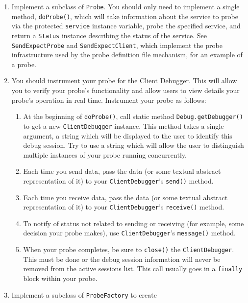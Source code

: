 \documentclass{article}
\newcommand{\identifier}[1]{{\tt #1}}
\begin{document}
\begin{enumerate}
\item Implement a subclass of \identifier{Probe}. You should only need
  to implement a single method, \identifier{doProbe()}, which will
  take information about the service to probe via the protected
  \identifier{service} instance variable, probe the specified service,
  and return a \identifier{Status} instance describing the status of
  the service. See \identifier{SendExpectProbe} and
  \identifier{SendExpectClient}, which implement the probe
  infrastructure used by the probe definition file mechanism, for an
  example of a probe.
\item You should instrument your probe for the Client Debugger. This
  will allow you to verify your probe's functionality and allow users
  to view details your probe's operation in real time. Instrument your
  probe as follows:
  \begin{enumerate}
    \item At the beginning of \identifier{doProbe()}, call static
      method \identifier{Debug.getDebugger()} to get a new
      \identifier{ClientDebugger} instance. This method takes a single
      argument, a string which will be displayed to the user to
      identify this debug session. Try to use a string which will
      allow the user to distinguish multiple instances of your probe
      running concurrently.
    \item Each time you send data, pass the data (or some textual abstract
      representation of it) to your \identifier{ClientDebugger}'s
      \identifier{send()} method.
    \item Each time you receive data, pass the data (or some textual abstract
      representation of it) to your \identifier{ClientDebugger}'s
      \identifier{receive()} method.
    \item To notify of status not related to sending or receiving
      (for example, some decision your probe makes), use
      \identifier{ClientDebugger}'s \identifier{message()} method.
      \item When your probe completes, be sure to \identifier{close()}
        the \identifier{ClientDebugger}. This must be done or the
        debug session information will never be removed from the
        active sessions list. This call usually goes in a
        \identifier{finally} block within your probe.
  \end{enumerate}
\item Implement a subclass of \identifier{ProbeFactory} to create

\end{enumerate}
\end{document}
